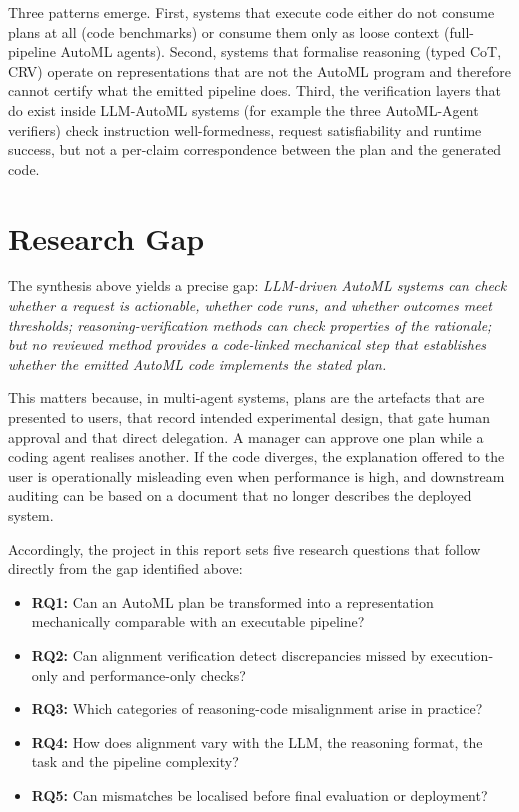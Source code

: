 Three patterns emerge. First, systems that execute code either do not
consume plans at all (code benchmarks) or consume them only as
loose context (full-pipeline AutoML agents). Second, systems that
formalise reasoning (typed CoT, CRV) operate on representations that
are not the AutoML program and therefore cannot certify what the
emitted pipeline does. Third, the verification layers that do exist
inside LLM-AutoML systems (for example the three AutoML-Agent
verifiers) check instruction well-formedness, request satisfiability
and runtime success, but not a per-claim correspondence between the
plan and the generated code.

\section{Research Gap}

The synthesis above yields a precise gap: \emph{LLM-driven AutoML
systems can check whether a request is actionable, whether code
runs, and whether outcomes meet thresholds; reasoning-verification
methods can check properties of the rationale; but no reviewed
method provides a code-linked mechanical step that establishes
whether the emitted AutoML code implements the stated plan.}

This matters because, in multi-agent systems, plans are the
artefacts that are presented to users, that record intended
experimental design, that gate human approval and that direct
delegation. A manager can approve one plan while a coding agent
realises another. If the code diverges, the explanation offered to
the user is operationally misleading even when performance is high,
and downstream auditing can be based on a document that no longer
describes the deployed system.

Accordingly, the project in this report sets five research questions
that follow directly from the gap identified above:

\begin{itemize}
    \item \textbf{RQ1:} Can an AutoML plan be transformed into a
    representation mechanically comparable with an executable
    pipeline?
    \item \textbf{RQ2:} Can alignment verification detect
    discrepancies missed by execution-only and performance-only
    checks?
    \item \textbf{RQ3:} Which categories of reasoning-code
    misalignment arise in practice?
    \item \textbf{RQ4:} How does alignment vary with the LLM, the
    reasoning format, the task and the pipeline complexity?
    \item \textbf{RQ5:} Can mismatches be localised before final
    evaluation or deployment?
\end{itemize}

